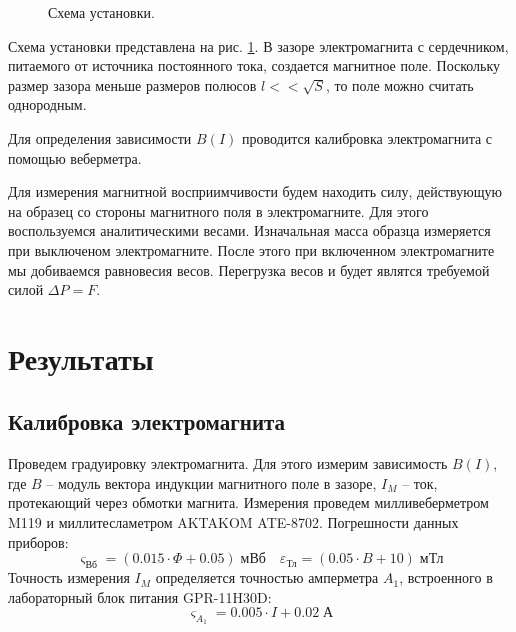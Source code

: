 \documentclass[12pt,a4paper]{article}
\begin{document}
	\begin{figure}[h]
		\caption{Схема установки.}
		\label{img:scheme}
	\end{figure}

	Схема установки представлена на рис. \ref{img:scheme}. В зазоре электромагнита с сердечником, питаемого от источника постоянного тока, создается магнитное поле. Поскольку размер зазора меньше размеров полюсов $l << \sqrt{S}$, то поле можно считать однородным.
	
	Для определения зависимости $B(I)$ проводится калибровка электромагнита с помощью веберметра.
	
	Для измерения магнитной восприимчивости будем находить силу, действующую на образец со стороны магнитного поля в электромагните. Для этого воспользуемся аналитическими весами. Изначальная масса образца измеряется при выключеном электромагните. После этого при включенном электромагните мы добиваемся равновесия весов. Перегрузка весов и будет являтся требуемой силой $\Delta P = F$.
	
	\section*{Результаты}
	
	\subsection*{Калибровка электромагнита}
	
	Проведем градуировку электромагнита. Для этого измерим зависимость $B(I)$, где $B$ -- модуль вектора индукции магнитного поле в зазоре, $I_M$ -- ток, протекающий через обмотки магнита. Измерения проведем милливеберметром M119 и миллитесламетром AKTAKOM ATE-8702. Погрешности данных приборов:
	$$ \varsigma_{\text{Вб}} = (0.015 \cdot \Phi + 0.05) \; \text{мВб} \quad \varepsilon_{\text{Тл}} = (0.05 \cdot B + 10) \; \text{мТл}$$
	Точность измерения $I_M$ определяется точностью амперметра $A_1$, встроенного в лабораторный блок питания GPR-11H30D: $$\varsigma_{A_1} = 0.005 \cdot I + 0.02 \; \text{А}$$
	
\end{document}

